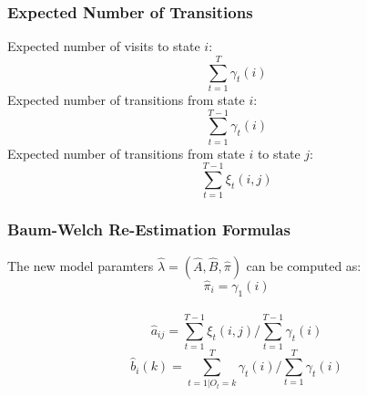 \documentclass{beamer}
\begin{document}
\begin{frame}
    \frametitle{Expected Number of Transitions}
    Expected number of visits to state $i$:
    \begin{displaymath}
        \sum_{t=1}^{T}\gamma_t(i)
    \end{displaymath}
     Expected number of transitions from state $i$:
    \begin{displaymath}
        \sum_{t=1}^{T-1}\gamma_t(i)
    \end{displaymath}
     Expected number of transitions from state $i$ to state $j$:
    \begin{displaymath}
        \sum_{t=1}^{T-1}\xi_t(i,j)
    \end{displaymath}
\end{frame}


\begin{frame}
    \frametitle{Baum-Welch Re-Estimation Formulas}
    The new model paramters $\hat{\lambda}=(\hat{A},\hat{B},\hat{\pi})$ can be
    computed as:
    \begin{displaymath}
        \hat{\pi}_i = \gamma_1(i)
    \end{displaymath}\\
    \begin{displaymath}
        \hat{a}_{ij} = \sum_{t=1}^{T-1}\xi_t(i,j) \Bigg/ \sum_{t=1}^{T-1}\gamma_t(i)
    \end{displaymath}
    \vfill
    \begin{displaymath}
        \hat{b}_i(k) = \sum_{t=1 | O_t=k}^T\gamma_t(i) \Bigg/ \sum_{t=1}^T\gamma_t(i)
    \end{displaymath}
\end{frame}

\end{document}
